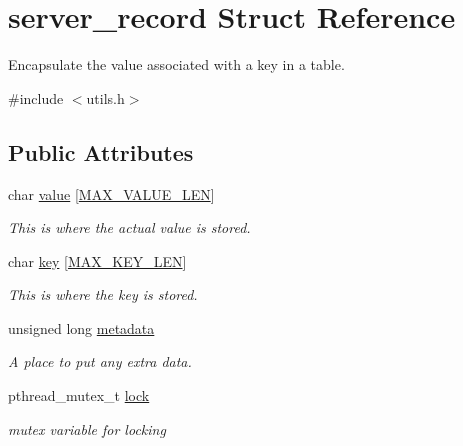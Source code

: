 \hypertarget{structserver__record}{\section{server\-\_\-record Struct Reference}
\label{structserver__record}
}


Encapsulate the value associated with a key in a table.  




{\ttfamily \#include $<$utils.\-h$>$}

\subsection*{Public Attributes}
\begin{DoxyCompactItemize}
\item 
\hypertarget{structserver__record_ae67bbc96f79005ada8b189afb0ef7d24}{char \hyperlink{structserver__record_ae67bbc96f79005ada8b189afb0ef7d24}{value} \mbox{[}\hyperlink{storage_8h_a00a29850f2b5b985f776f864d83e5ac3}{M\-A\-X\-\_\-\-V\-A\-L\-U\-E\-\_\-\-L\-E\-N}\mbox{]}}\label{structserver__record_ae67bbc96f79005ada8b189afb0ef7d24}

\begin{DoxyCompactList}\small\item\em This is where the actual value is stored. \end{DoxyCompactList}\item 
\hypertarget{structserver__record_a919f0a2075e73559f0f86247bc90aac7}{char \hyperlink{structserver__record_a919f0a2075e73559f0f86247bc90aac7}{key} \mbox{[}\hyperlink{storage_8h_ad91bfaf106e42aa552f1605c5b8a9ef2}{M\-A\-X\-\_\-\-K\-E\-Y\-\_\-\-L\-E\-N}\mbox{]}}\label{structserver__record_a919f0a2075e73559f0f86247bc90aac7}

\begin{DoxyCompactList}\small\item\em This is where the key is stored. \end{DoxyCompactList}\item 
\hypertarget{structserver__record_aea6b5a88026f502cdac84beed45d305c}{unsigned long \hyperlink{structserver__record_aea6b5a88026f502cdac84beed45d305c}{metadata}}\label{structserver__record_aea6b5a88026f502cdac84beed45d305c}

\begin{DoxyCompactList}\small\item\em A place to put any extra data. \end{DoxyCompactList}\item 
\hypertarget{structserver__record_aa193fec2d188ca8cc31152e2e4a79b50}{pthread\-\_\-mutex\-\_\-t \hyperlink{structserver__record_aa193fec2d188ca8cc31152e2e4a79b50}{lock}}\label{structserver__record_aa193fec2d188ca8cc31152e2e4a79b50}

\begin{DoxyCompactList}\small\item\em mutex variable for locking \end{DoxyCompactList}\end{DoxyCompactItemize}


